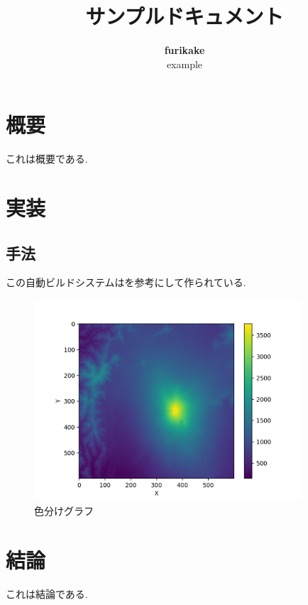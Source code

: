 \documentclass[10pt, a4paper]{jsarticle}
\title{サンプルドキュメント}
\author{{\bf furikake}\\{\small example}}
\date{}
\newcommand{\1}{\mbox{1}\hspace{-0.25em}\mbox{l}}
\begin{document}
\maketitle

\section{概要}

これは概要である.

\section{実装}
\subsection{手法}

この自動ビルドシステムは\cite{ci}を参考にして作られている.

\begin{figure}[htbp]
  \centering
  \includegraphics[width=10cm]{Figure_1.png}
  \caption{色分けグラフ}
  \label{fig: 2dcolor}
\end{figure}

\section{結論}

これは結論である.

\newpage


\end{document}
